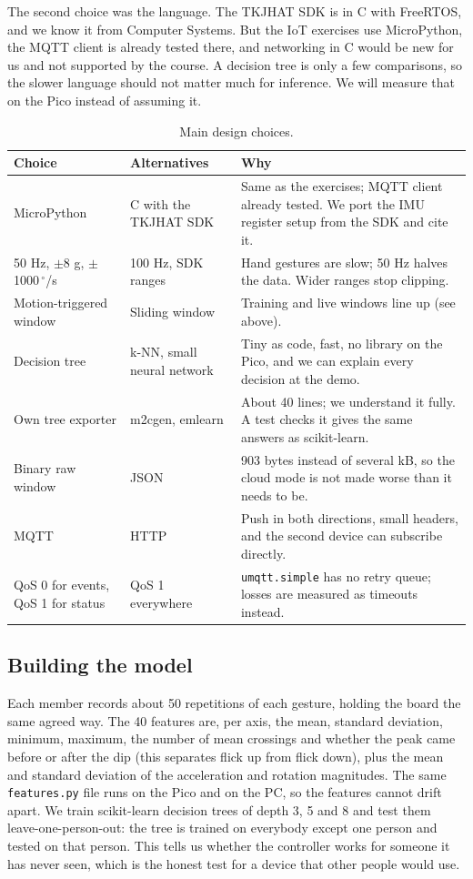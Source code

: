 \documentclass{article}
\newcommand{\dps}{\,$^\circ$/s}
\begin{document}
The second choice was the language. The TKJHAT SDK is in C with FreeRTOS, and we know it from Computer Systems. But the IoT exercises use MicroPython, the MQTT client is already tested there, and networking in C would be new for us and not supported by the course. A decision tree is only a few comparisons, so the slower language should not matter much for inference. We will measure that on the Pico instead of assuming it.

\begin{table}[htbp]
\centering
\caption{Main design choices.}
\label{tab:choices}
\begin{tabularx}{\textwidth}{@{}p{2.9cm} p{3.2cm} L@{}}
\toprule
Choice & Alternatives & Why \\
\midrule
MicroPython & C with the TKJHAT SDK & Same as the exercises; MQTT client already tested. We port the IMU register setup from the SDK and cite it. \\
50 Hz, $\pm$8 g, $\pm$1000\dps & 100 Hz, SDK ranges & Hand gestures are slow; 50 Hz halves the data. Wider ranges stop clipping. \\
Motion-triggered window & Sliding window & Training and live windows line up (see above). \\
Decision tree & k-NN, small neural network & Tiny as code, fast, no library on the Pico, and we can explain every decision at the demo. \\
Own tree exporter & m2cgen, emlearn & About 40 lines; we understand it fully. A test checks it gives the same answers as scikit-learn. \\
Binary raw window & JSON & 903 bytes instead of several kB, so the cloud mode is not made worse than it needs to be. \\
MQTT & HTTP & Push in both directions, small headers, and the second device can subscribe directly. \\
QoS 0 for events, QoS 1 for status & QoS 1 everywhere & \texttt{umqtt.simple} has no retry queue; losses are measured as timeouts instead. \\
\bottomrule
\end{tabularx}
\end{table}

\subsection{Building the model}

Each member records about 50 repetitions of each gesture, holding the board the same agreed way. The 40 features are, per axis, the mean, standard deviation, minimum, maximum, the number of mean crossings and whether the peak came before or after the dip (this separates flick up from flick down), plus the mean and standard deviation of the acceleration and rotation magnitudes. The same \texttt{features.py} file runs on the Pico and on the PC, so the features cannot drift apart. We train scikit-learn decision trees of depth 3, 5 and 8 and test them leave-one-person-out: the tree is trained on everybody except one person and tested on that person. This tells us whether the controller works for someone it has never seen, which is the honest test for a device that other people would use.
\end{document}
